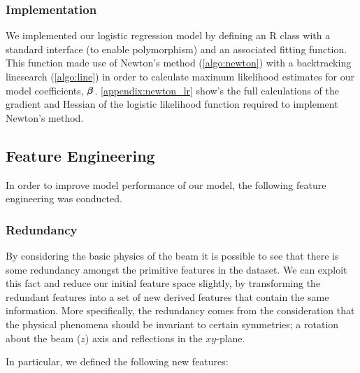 \subsubsection{Implementation}
We implemented our logistic regression model by defining an R class with a standard interface (to enable polymorphism) and an associated fitting function. This function made use of Newton's method (\ref{algo:newton}) with a backtracking linesearch (\ref{algo:line}) in order to calculate maximum likelihood estimates for our model coefficients, $\bm{\beta}$. \ref{appendix:newton_lr} show's the full calculations of the gradient and Hessian of the logistic likelihood function required to implement Newton's method.

\subsection{Feature Engineering}
In order to improve model performance of our model, the following feature engineering was conducted.

\subsubsection{Redundancy}
By considering the basic physics of the beam it is possible to see that there is some redundancy amongst the primitive features in the dataset. We can exploit this fact and reduce our initial feature space slightly, by transforming the redundant features into a set of new derived features that contain the same information. 
More specifically, the redundancy comes from the consideration that the physical phenomena should be invariant to certain symmetries; a rotation about the beam ($z$) axis and reflections in the $xy$-plane.

In particular, we defined the following new features:

